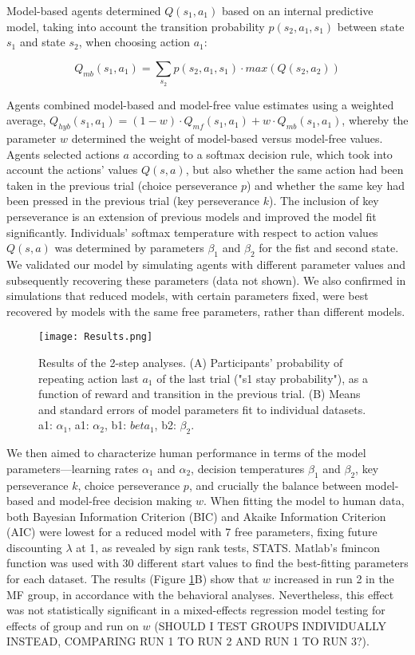 \documentclass[11pt]{article} %
\begin{document}
Model-based agents determined $Q(s_{1}, a_{1})$ based on an internal predictive model, taking into account the transition probability $p(s_{2}, a_{1}, s_{1})$ between state $s_{1}$ and state $s_{2}$, when choosing action $a_{1}$:

\begin{equation}
Q_{mb}(s_{1}, a_{1}) = \sum_{s_{2}} p(s_{2}, a_{1}, s_{1}) \cdot max(Q(s_{2}, a_{2}))
\end{equation}

Agents combined model-based and model-free value estimates using a weighted average, $Q_{hyb}(s_{1}, a_{1}) = (1 - w) \cdot Q_{mf}(s_{1}, a_{1}) + w \cdot Q_{mb}(s_{1}, a_{1})$, whereby the parameter $w$ determined the weight of model-based versus model-free values. Agents selected actions $a$ according to a softmax decision rule, which took into account the actions' values $Q(s, a)$, but also whether the same action had been taken in the previous trial (choice perseverance $p$) and whether the same key had been pressed in the previous trial (key perseverance $k$). The inclusion of key perseverance is an extension of previous models and improved the model fit significantly. Individuals' softmax temperature with respect to action values $Q(s, a)$ was determined by parameters $\beta_{1}$ and $\beta_{2}$ for the fist and second state. We validated our model by simulating agents with different parameter values and subsequently recovering these parameters (data not shown). We also confirmed in simulations that reduced models, with certain parameters fixed, were best recovered by models with the same free parameters, rather than different models. 

\begin{figure}
	\texttt{[image: Results.png]}
	\caption{Results of the 2-step analyses. (A) Participants' probability of repeating action last $a_{1}$ of the last trial ("s1 stay probability"), as a function of reward and transition in the previous trial. (B) Means and standard errors of model parameters fit to individual datasets. a1: $\alpha_{1}$, a1: $\alpha_{2}$, b1: $beta_{1}$, b2: $\beta_{2}$.}
	\label{Results}
\end{figure}

We then aimed to characterize human performance in terms of the model parameters---learning rates $\alpha_{1}$ and $\alpha_{2}$, decision temperatures $\beta_{1}$ and $\beta_{2}$, key perseverance $k$, choice perseverance $p$, and crucially the balance between model-based and model-free decision making $w$. When fitting the model to human data, both Bayesian Information Criterion (BIC) and Akaike Information Criterion (AIC) were lowest for a reduced model with 7 free parameters, fixing future discounting $\lambda$ at 1, as revealed by sign rank tests, STATS. Matlab's fmincon function was used with 30 different start values to find the best-fitting parameters for each dataset. The results (Figure \ref{Results}B) show that $w$ increased in run 2 in the MF group, in accordance with the behavioral analyses. Nevertheless, this effect was not statistically significant in a mixed-effects regression model testing for effects of group and run on $w$ (SHOULD I TEST GROUPS INDIVIDUALLY INSTEAD, COMPARING RUN 1 TO RUN 2 AND RUN 1 TO RUN 3?).
\end{document}
